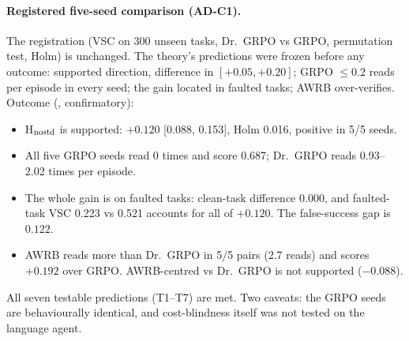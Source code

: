 \documentclass[11pt]{article}
\begin{document}
\paragraph{Registered five-seed comparison (AD-C1).} The registration (VSC on 300 unseen tasks, Dr.~GRPO vs GRPO,
permutation test, Holm) is unchanged. The theory's predictions were frozen before any outcome: supported direction,
difference in $[+0.05,+0.20]$; GRPO $\le0.2$ reads per episode in every seed; the gain located in faulted tasks; AWRB
over-verifies. Outcome (, confirmatory):
\begin{itemize}
\item H$_{\rm nostd}$ is supported: $+0.120$ [0.088, 0.153], Holm 0.016, positive in 5/5 seeds.
\item All five GRPO seeds read 0 times and score 0.687; Dr.~GRPO reads 0.93--2.02 times per episode.
\item The whole gain is on faulted tasks: clean-task difference 0.000, and faulted-task VSC 0.223 vs 0.521 accounts for
all of $+0.120$. The false-success gap is $0.122$.
\item AWRB reads more than Dr.~GRPO in 5/5 pairs (2.7 reads) and scores $+0.192$ over GRPO. AWRB-centred vs
Dr.~GRPO is not supported ($-0.088$).
\end{itemize}
All seven testable predictions (T1--T7) are met. Two caveats: the GRPO seeds are behaviourally identical, and
cost-blindness itself was not tested on the language agent.
\end{document}
